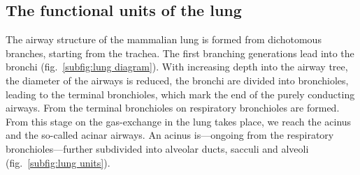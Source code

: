 \subsection{The functional units of the lung}
The airway structure of the mammalian lung is formed from dichotomous branches, starting from the trachea. The first branching generations lead into the bronchi (fig.~\ref{subfig:lung diagram}). With increasing depth into the airway tree, the diameter of the airways is reduced, the bronchi are divided into bronchioles, leading to the terminal bronchioles, which mark the end of the purely conducting airways. From the terminal bronchioles on respiratory bronchioles are formed. From this stage on the gas-exchange in the lung takes place, we reach the acinus and the so-called acinar airways. An acinus is---ongoing from the respiratory bronchioles---further subdivided into alveolar ducts, sacculi and alveoli (fig.~\ref{subfig:lung units}).

